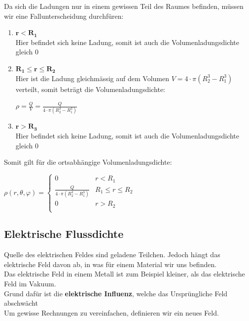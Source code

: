 \beginbsp
Da sich die Ladungen nur in einem gewissen Teil des Raumes befinden, müssen wir eine Fallunterscheidung durchfüren:
\begin{enumerate}
	\item $\mathbf{r < R_1}$ \\
	Hier befindet sich keine Ladung, somit ist auch die Volumenladungsdichte gleich 0
		\item $\mathbf{R_1 \leq r \leq R_2}$ \\
		Hier ist die Ladung gleichmässig auf dem Volumen $V = 4\cdot \pi (R_2^3 - R_1^3)$ verteilt, somit beträgt die Volumenladungsdichte:
		\begin{center}
			$\displaystyle \rho = \frac{Q}{V} = \frac{Q}{4 \cdot \pi (R_2^3 - R_1^3) }$
		\end{center}
		\item $\mathbf{r > R_3}$ \\
		Hier befindet sich keine Ladung, somit ist auch die Volumenladungsdichte gleich 0
\end{enumerate}

Somit gilt für die ortsabhängige Volumenladungsdichte:
\begin{center}
	$\displaystyle	\rho(r,\theta,\varphi) =
		\begin{cases}
			0                                       & r < R_1 \\
		 \frac{Q}{4 \cdot \pi (R_2^3 - R_1^3)} & R_1 \leq r \leq R_2\\
				0                                       & r > R_2 \\
		\end{cases}$
\end{center}

\iend


\newpage

\subsection{Elektrische Flussdichte}
Quelle des elektrischen Feldes sind geladene Teilchen. Jedoch hängt das elektrische Feld davon ab, in was für einem Material wir uns befinden. \\
Das elektrische Feld in einem Metall ist zum Beispiel kleiner, als das elektrische Feld im Vakuum. \\
Grund dafür ist die \textbf{elektrische Influenz}, welche das Ursprüngliche Feld abschwächt \\
Um gewisse Rechnungen zu vereinfachen, definieren wir ein neues Feld.

